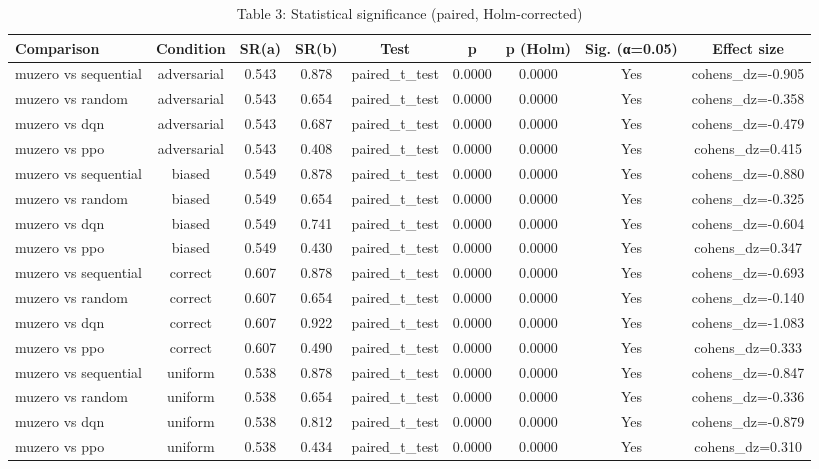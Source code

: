\begin{table}[htbp]
\centering
\caption{Table 3: Statistical significance (paired, Holm-corrected)}
\begin{tabular}{lcccccccc}
\toprule
Comparison & Condition & SR(a) & SR(b) & Test & p & p (Holm) & Sig. (α=0.05) & Effect size \\
\midrule
muzero vs sequential & adversarial & 0.543 & 0.878 & paired_t_test & 0.0000 & 0.0000 & Yes & cohens_dz=-0.905 \\
muzero vs random & adversarial & 0.543 & 0.654 & paired_t_test & 0.0000 & 0.0000 & Yes & cohens_dz=-0.358 \\
muzero vs dqn & adversarial & 0.543 & 0.687 & paired_t_test & 0.0000 & 0.0000 & Yes & cohens_dz=-0.479 \\
muzero vs ppo & adversarial & 0.543 & 0.408 & paired_t_test & 0.0000 & 0.0000 & Yes & cohens_dz=0.415 \\
muzero vs sequential & biased & 0.549 & 0.878 & paired_t_test & 0.0000 & 0.0000 & Yes & cohens_dz=-0.880 \\
muzero vs random & biased & 0.549 & 0.654 & paired_t_test & 0.0000 & 0.0000 & Yes & cohens_dz=-0.325 \\
muzero vs dqn & biased & 0.549 & 0.741 & paired_t_test & 0.0000 & 0.0000 & Yes & cohens_dz=-0.604 \\
muzero vs ppo & biased & 0.549 & 0.430 & paired_t_test & 0.0000 & 0.0000 & Yes & cohens_dz=0.347 \\
muzero vs sequential & correct & 0.607 & 0.878 & paired_t_test & 0.0000 & 0.0000 & Yes & cohens_dz=-0.693 \\
muzero vs random & correct & 0.607 & 0.654 & paired_t_test & 0.0000 & 0.0000 & Yes & cohens_dz=-0.140 \\
muzero vs dqn & correct & 0.607 & 0.922 & paired_t_test & 0.0000 & 0.0000 & Yes & cohens_dz=-1.083 \\
muzero vs ppo & correct & 0.607 & 0.490 & paired_t_test & 0.0000 & 0.0000 & Yes & cohens_dz=0.333 \\
muzero vs sequential & uniform & 0.538 & 0.878 & paired_t_test & 0.0000 & 0.0000 & Yes & cohens_dz=-0.847 \\
muzero vs random & uniform & 0.538 & 0.654 & paired_t_test & 0.0000 & 0.0000 & Yes & cohens_dz=-0.336 \\
muzero vs dqn & uniform & 0.538 & 0.812 & paired_t_test & 0.0000 & 0.0000 & Yes & cohens_dz=-0.879 \\
muzero vs ppo & uniform & 0.538 & 0.434 & paired_t_test & 0.0000 & 0.0000 & Yes & cohens_dz=0.310 \\
\bottomrule
\end{tabular}
\end{table}
